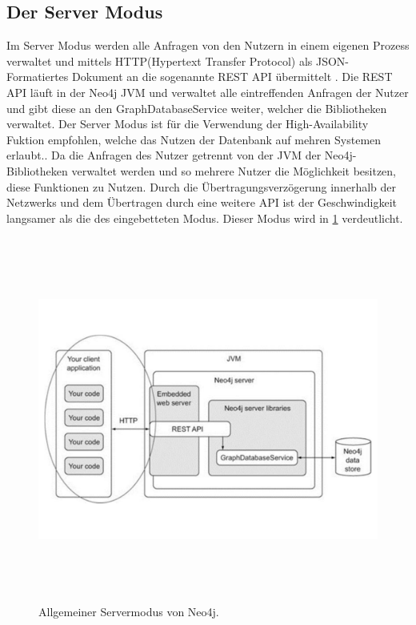 \subsection{Der Server Modus}
Im Server Modus werden alle Anfragen von den Nutzern in einem eigenen Prozess verwaltet und mittels HTTP(Hypertext Transfer Protocol) als JSON-Formatiertes Dokument an die sogenannte REST API übermittelt \parencite{robinson2013graph}. Die REST API läuft in der Neo4j JVM und  verwaltet alle eintreffenden Anfragen der Nutzer und gibt diese an den GraphDatabaseService weiter, welcher die Bibliotheken verwaltet. \newline 
Der Server Modus ist für die Verwendung der High-Availability Fuktion empfohlen, welche das Nutzen der Datenbank auf mehren Systemen erlaubt.\parencite{raj2015neo4j}. Da die Anfragen des Nutzer getrennt von der JVM der Neo4j-Bibliotheken verwaltet werden und so mehrere Nutzer die Möglichkeit besitzen, diese Funktionen zu Nutzen. Durch die  Übertragungsverzögerung innerhalb der Netzwerks und dem Übertragen durch eine weitere API ist der Geschwindigkeit langsamer als die des eingebetteten Modus. Dieser Modus wird in \ref{fig:Server} verdeutlicht.
\begin{figure}[!htb]
	\centering
	\includegraphics [width=14cm, height=12cm]{Figures/Server}
	\caption[Server]{Allgemeiner Servermodus von Neo4j.}
	\label{fig:Server}
	\FloatBarrier
\end{figure}

